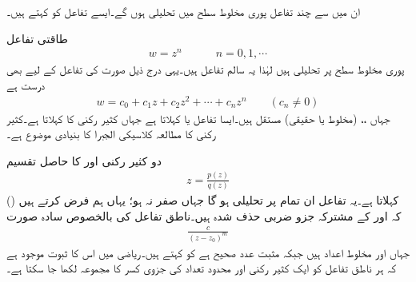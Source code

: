 ان میں سے چند تفاعل پوری مخلوط سطح میں تحلیلی ہوں گے۔ایسے تفاعل کو  کہتے ہیں۔ 

طاقتی تفاعل
\begin{align}
w=z^n\quad \quad \quad n=0,1,\cdots
\end{align}
پوری مخلوط سطح پر تحلیلی ہیں لہٰذا یہ سالم تفاعل ہیں۔یہی درج ذیل صورت کی تفاعل کے لیے بھی درست ہے
\begin{align}
w=c_0+c_1z+c_2z^2+\cdots+c_nz^n\quad \quad (c_n\ne 0)
\end{align}
جہاں ،، (مخلوط یا حقیقی) مستقل ہیں۔ایسا تفاعل  یا  کہلاتا ہے جہاں   کثیر رکنی کا  کہلاتا ہے۔کثیر رکنی کا مطالعہ کلاسیکی الجبرا کا بنیادی موضوع ہے۔

دو کثیر رکنی  اور  کا حاصل تقسیم
\begin{align}
z=\frac{p(z)}{q(z)}
\end{align}
()  کہلاتا ہے۔یہ تفاعل ان تمام  پر تحلیلی ہو گا جہاں  صفر نہ ہو؛ یہاں ہم فرض کرتے ہیں کہ  اور  کے مشترکہ جزو ضربی حذف شدہ ہیں۔ناطق تفاعل کی بالخصوص سادہ صورت
\begin{align}
\frac{c}{(z-z_0)^m}
\end{align}
جہاں  اور  مخلوط اعداد ہیں جبکہ  مثبت عدد صحیح ہے کو  کہتے ہیں۔ریاضی میں اس کا ثبوت موجود ہے کہ ہر ناطق تفاعل کو ایک کثیر رکنی اور محدود تعداد کی جزوی کسر کا مجموعہ لکھا جا سکتا ہے۔

